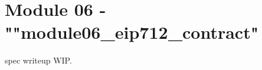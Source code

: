 \newpage
\section{Module 06 - {\ttfamily ""module06\_eip712\_contract"}}
\label{sec:module06_predicate}

spec writeup WIP.

